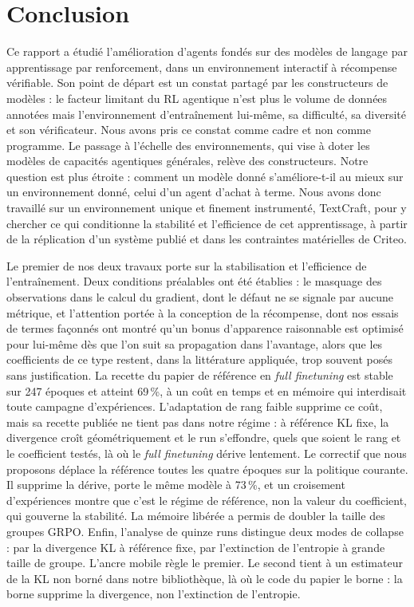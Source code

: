 \documentclass[11pt,a4paper]{article}
\begin{document}
\clearpage
\section{Conclusion}

Ce rapport a étudié l'amélioration d'agents fondés sur des modèles de langage par apprentissage par renforcement, dans un environnement interactif à récompense vérifiable. Son point de départ est un constat partagé par les constructeurs de modèles : le facteur limitant du RL agentique n'est plus le volume de données annotées mais l'environnement d'entraînement lui-même, sa difficulté, sa diversité et son vérificateur. Nous avons pris ce constat comme cadre et non comme programme. Le passage à l'échelle des environnements, qui vise à doter les modèles de capacités agentiques générales, relève des constructeurs. Notre question est plus étroite : comment un modèle donné s'améliore-t-il au mieux sur un environnement donné, celui d'un agent d'achat à terme. Nous avons donc travaillé sur un environnement unique et finement instrumenté, TextCraft, pour y chercher ce qui conditionne la stabilité et l'efficience de cet apprentissage, à partir de la réplication d'un système publié et dans les contraintes matérielles de Criteo.

Le premier de nos deux travaux porte sur la stabilisation et l'efficience de l'entraînement. Deux conditions préalables ont été établies : le masquage des observations dans le calcul du gradient, dont le défaut ne se signale par aucune métrique, et l'attention portée à la conception de la récompense, dont nos essais de termes façonnés ont montré qu'un bonus d'apparence raisonnable est optimisé pour lui-même dès que l'on suit sa propagation dans l'avantage, alors que les coefficients de ce type restent, dans la littérature appliquée, trop souvent posés sans justification. La recette du papier de référence en \emph{full finetuning} est stable sur 247 époques et atteint 69\,\%, à un coût en temps et en mémoire qui interdisait toute campagne d'expériences. L'adaptation de rang faible supprime ce coût, mais sa recette publiée ne tient pas dans notre régime : à référence KL fixe, la divergence croît géométriquement et le run s'effondre, quels que soient le rang et le coefficient testés, là où le \emph{full finetuning} dérive lentement. Le correctif que nous proposons déplace la référence toutes les quatre époques sur la politique courante. Il supprime la dérive, porte le même modèle à 73\,\%, et un croisement d'expériences montre que c'est le régime de référence, non la valeur du coefficient, qui gouverne la stabilité. La mémoire libérée a permis de doubler la taille des groupes GRPO. Enfin, l'analyse de quinze runs distingue deux modes de collapse : par la divergence KL à référence fixe, par l'extinction de l'entropie à grande taille de groupe. L'ancre mobile règle le premier. Le second tient à un estimateur de la KL non borné dans notre bibliothèque, là où le code du papier le borne : la borne supprime la divergence, non l'extinction de l'entropie.
\end{document}
